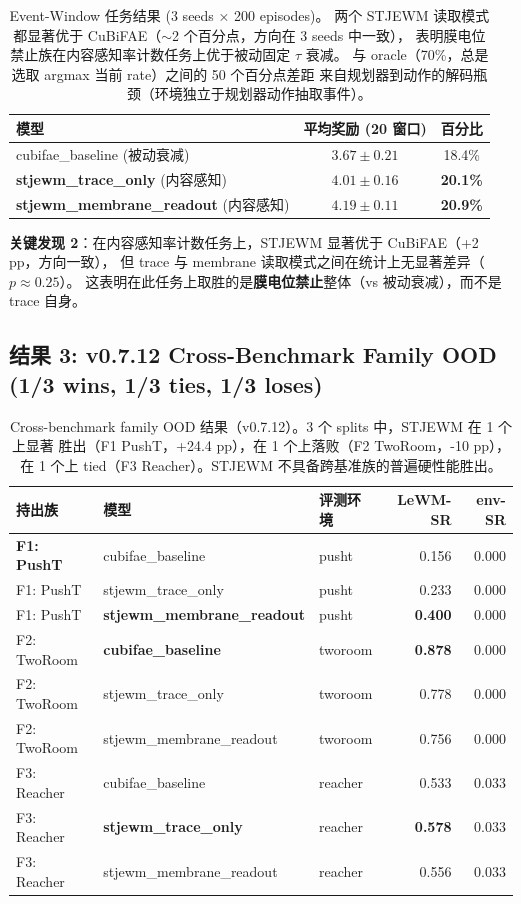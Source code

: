 \documentclass[11pt,a4paper]{article}
\begin{document}
\begin{table}[ht]
\centering
\begin{tabular}{lcc}
\toprule
模型 & 平均奖励 (20 窗口) & 百分比 \\
\midrule
cubifae\_baseline (被动衰减) & $3.67 \pm 0.21$ & 18.4\% \\
\textbf{stjewm\_trace\_only} (内容感知) & $4.01 \pm 0.16$ & \textbf{20.1\%} \\
\textbf{stjewm\_membrane\_readout} (内容感知) & $4.19 \pm 0.11$ & \textbf{20.9\%} \\
\bottomrule
\end{tabular}
\caption{Event-Window 任务结果 (3 seeds × 200 episodes)。
两个 STJEWM 读取模式都显著优于 CuBiFAE（$\sim$2 个百分点，方向在 3 seeds 中一致），
表明膜电位禁止族在内容感知率计数任务上优于被动固定 $\tau$ 衰减。
与 oracle（70\%，总是选取 argmax 当前 rate）之间的 50 个百分点差距
来自规划器到动作的解码瓶颈（环境独立于规划器动作抽取事件）。}
\label{tab:event-window}
\end{table}

\textbf{关键发现 2}：在内容感知率计数任务上，STJEWM 显著优于 CuBiFAE（+2 pp，方向一致），
但 trace 与 membrane 读取模式之间在统计上无显著差异（$p \approx 0.25$）。
这表明在此任务上取胜的是\textbf{膜电位禁止}整体（vs 被动衰减），而不是 trace 自身。

\subsection{结果 3: v0.7.12 Cross-Benchmark Family OOD (1/3 wins, 1/3 ties, 1/3 loses)}

\begin{table}[ht]
\centering
\small
\begin{tabular}{lllrr}
\toprule
持出族 & 模型 & 评测环境 & LeWM-SR & env-SR \\
\midrule
\textbf{F1: PushT} & cubifae\_baseline & pusht & 0.156 & 0.000 \\
F1: PushT &stjewm\_trace\_only & pusht & 0.233 & 0.000 \\
F1: PushT &\textbf{stjewm\_membrane\_readout} & pusht & \textbf{0.400} & 0.000 \\
\midrule
F2: TwoRoom &\textbf{cubifae\_baseline} & tworoom & \textbf{0.878} & 0.000 \\
F2: TwoRoom &stjewm\_trace\_only & tworoom & 0.778 & 0.000 \\
F2: TwoRoom &stjewm\_membrane\_readout & tworoom & 0.756 & 0.000 \\
\midrule
F3: Reacher &cubifae\_baseline & reacher & 0.533 & 0.033 \\
F3: Reacher &\textbf{stjewm\_trace\_only} & reacher & \textbf{0.578} & 0.033 \\
F3: Reacher &stjewm\_membrane\_readout & reacher & 0.556 & 0.033 \\
\bottomrule
\end{tabular}
\caption{Cross-benchmark family OOD 结果（v0.7.12）。3 个 splits 中，STJEWM 在 1 个上显著
胜出（F1 PushT，+24.4 pp），在 1 个上落败（F2 TwoRoom，-10 pp），
在 1 个上 tied（F3 Reacher）。STJEWM 不具备跨基准族的普遍硬性能胜出。}
\label{tab:cross-benchmark}
\end{table}
\end{document}
